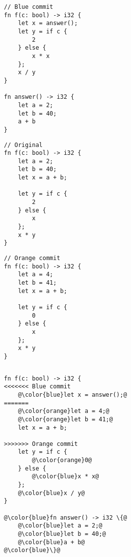 \documentclass[a4paper,11pt]{article}
\begin{document}
\noindent
\begin{minipage}{\textwidth}
\begin{minipage}{.32\textwidth}
\begin{lstlisting}[rulecolor=\color{blue!20}]
// Blue commit
fn f(c: bool) -> i32 {
    let x = answer();
    let y = if c {
        2
    } else {
        x * x
    };
    x / y
}

fn answer() -> i32 {
    let a = 2;
    let b = 40;
    a + b
}
\end{lstlisting}
\end{minipage}\hfill
\begin{minipage}{.32\textwidth}
\begin{lstlisting}
// Original
fn f(c: bool) -> i32 {
    let a = 2;
    let b = 40;
    let x = a + b;

    let y = if c {
        2
    } else {
        x
    };
    x * y
}
\end{lstlisting}
\end{minipage}\hfill
\begin{minipage}{.32\textwidth}
\begin{lstlisting}[rulecolor=\color{orange!30}]
// Orange commit
fn f(c: bool) -> i32 {
    let a = 4;
    let b = 41;
    let x = a + b;

    let y = if c {
        0
    } else {
        x
    };
    x * y
}
\end{lstlisting}
\end{minipage}
\vspace{-.4cm}
\begin{lstlisting}[label=lst:overview_commits, caption={A source code and two concurrent commits on it}]
\end{lstlisting}
\end{minipage}

\begin{lstlisting}[label=lst:overview_git_merge, caption={Output of git merge with the two commits above}]
 fn f(c: bool) -> i32 {
<<<<<<< Blue commit
    @\color{blue}let x = answer();@
=======
    @\color{orange}let a = 4;@
    @\color{orange}let b = 41;@
    let x = a + b;

>>>>>>> Orange commit
    let y = if c {
        @\color{orange}0@
    } else {
        @\color{blue}x * x@
    };
    @\color{blue}x / y@
}

@\color{blue}fn answer() -> i32 \{@
    @\color{blue}let a = 2;@
    @\color{blue}let b = 40;@
    @\color{blue}a + b@
@\color{blue}\}@
\end{lstlisting}
\end{document}
